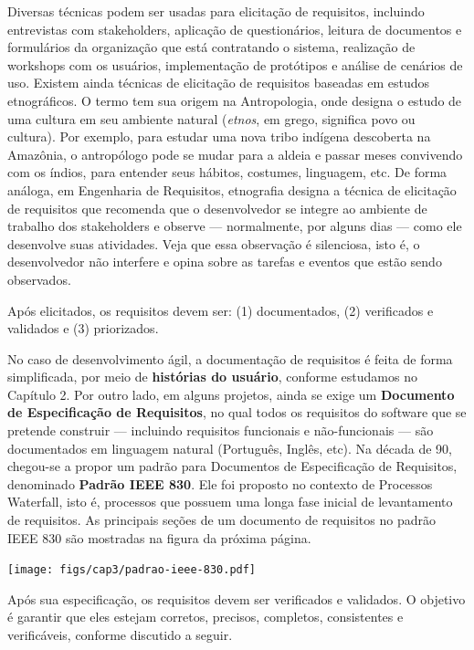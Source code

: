 \documentclass[
  11pt,
  twoside]{book}
\let\origfigure\figure
\let\endorigfigure\endfigure
\renewenvironment{figure}[1][2] {
    \expandafter\origfigure\expandafter[!h]
} {
    \endorigfigure
}
\begin{document}
Diversas técnicas podem ser usadas para elicitação de requisitos,
incluindo entrevistas com stakeholders, aplicação de questionários,
leitura de documentos e formulários da organização que está contratando
o sistema, realização de workshops com os usuários, implementação de
protótipos e análise de cenários de uso. Existem ainda técnicas de
elicitação de requisitos baseadas em estudos etnográficos. O termo tem
sua origem na Antropologia, onde designa o estudo de uma cultura em seu
ambiente natural (\emph{etnos}, em grego, significa povo ou cultura).
Por exemplo, para estudar uma nova tribo indígena descoberta na
Amazônia, o antropólogo pode se mudar para a aldeia e passar meses
convivendo com os índios, para entender seus hábitos, costumes,
linguagem, etc. De forma análoga, em Engenharia de Requisitos,
etnografia designa a técnica de elicitação de requisitos que recomenda
que o desenvolvedor se integre ao ambiente de trabalho dos stakeholders
e observe --- normalmente, por alguns dias --- como ele desenvolve suas
atividades. Veja que essa observação é silenciosa, isto é, o
desenvolvedor não interfere e opina sobre as tarefas e eventos que estão
sendo observados.

Após elicitados, os requisitos devem ser: (1) documentados, (2)
verificados e validados e (3) priorizados.

 No caso de desenvolvimento
ágil, a documentação de requisitos é feita de forma simplificada, por
meio de \textbf{histórias do usuário}, conforme estudamos no Capítulo 2.
Por outro lado, em alguns projetos, ainda se exige um \textbf{Documento
de Especificação de Requisitos}, no qual todos os requisitos do software
que se pretende construir --- incluindo requisitos funcionais e
não-funcionais --- são documentados em linguagem natural (Português,
Inglês, etc). Na década de 90, chegou-se a propor um padrão para
Documentos de Especificação de Requisitos, denominado \textbf{Padrão
IEEE 830}. Ele foi proposto no contexto de Processos Waterfall, isto é,
processos que possuem uma longa fase inicial de levantamento de
requisitos. As principais seções de um documento de requisitos no padrão
IEEE 830 são mostradas na figura da próxima página.

\begin{figure}
\centering
\texttt{[image: figs/cap3/padrao-ieee-830.pdf]}
\caption{Documento de Requisitos no Padrão IEEE 830}
\end{figure}

 Após sua especificação, os requisitos
devem ser verificados e validados. O objetivo é garantir que eles
estejam corretos, precisos, completos, consistentes e verificáveis,
conforme discutido a seguir.
\end{document}
